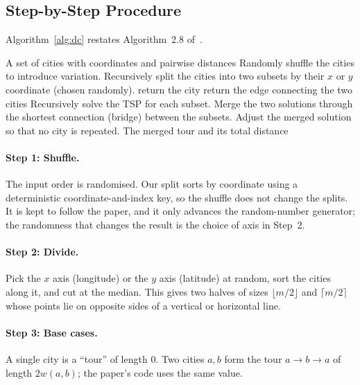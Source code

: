 \subsection{Step-by-Step Procedure}\label{sec:procedure}
Algorithm~\ref{alg:dc} restates Algorithm~2.8 of~\cite{lunagarcia2024performance}.

\begin{algorithm}[H]
\caption{Divide and Conquer approach for TSP (Algorithm~2.8 of~\cite{lunagarcia2024performance})}\label{alg:dc}
\begin{algorithmic}[1]
\Require A set of cities with coordinates and pairwise distances
\State Randomly shuffle the cities to introduce variation.
\State Recursively split the cities into two subsets by their $x$ or $y$ coordinate (chosen randomly).
 \State return the city
 \State return the edge connecting the two cities
\EndIf
\State Recursively solve the TSP for each subset.
\State Merge the two solutions through the shortest connection (bridge) between the subsets.
\State Adjust the merged solution so that no city is repeated.
\Ensure The merged tour and its total distance
\end{algorithmic}
\end{algorithm}

\paragraph{Step 1: Shuffle.} The input order is randomised. Our split sorts by coordinate using a
deterministic coordinate-and-index key, so the shuffle does not change the splits. It is kept to follow
the paper, and it only advances the random-number generator; the randomness that changes the result is
the choice of axis in Step~2.

\paragraph{Step 2: Divide.} Pick the $x$ axis (longitude) or the $y$ axis (latitude) at random, sort the
cities along it, and cut at the median. This gives two halves of sizes $\lfloor m/2\rfloor$ and
$\lceil m/2\rceil$ whose points lie on opposite sides of a vertical or horizontal line.

\paragraph{Step 3: Base cases.} A single city is a ``tour'' of length 0. Two cities $a,b$ form the tour
$a \to b \to a$ of length $2w(a,b)$; the paper's code uses the same value.

